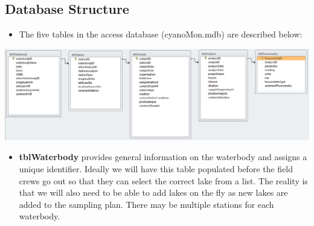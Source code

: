 \documentclass[]{article}
\begin{document}
\subsection{Database Structure}\label{database-structure}

\begin{itemize}
\itemsep1pt\parskip0pt
\item
  The five tables in the access database (cyanoMon.mdb) are described
  below:
\end{itemize}

\includegraphics{cyanoMonRelationships.jpg}

\begin{itemize}
\itemsep1pt\parskip0pt
\item
  \textbf{tblWaterbody} provides general information on the waterbody
  and assigns a unique identifier. Ideally we will have this table
  populated before the field crews go out so that they can select the
  correct lake from a list. The reality is that we will also need to be
  able to add lakes on the fly as new lakes are added to the sampling
  plan. There may be multiple stations for each waterbody.
\end{itemize}
\end{document}
